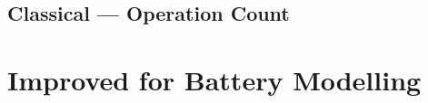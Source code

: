 \subsection{Classical  ---  Operation Count}\label{subsec:Traditional-DRA--CPU}




\section{Improved  for Battery Modelling}\label{sec:Efficient-Computation-of}

